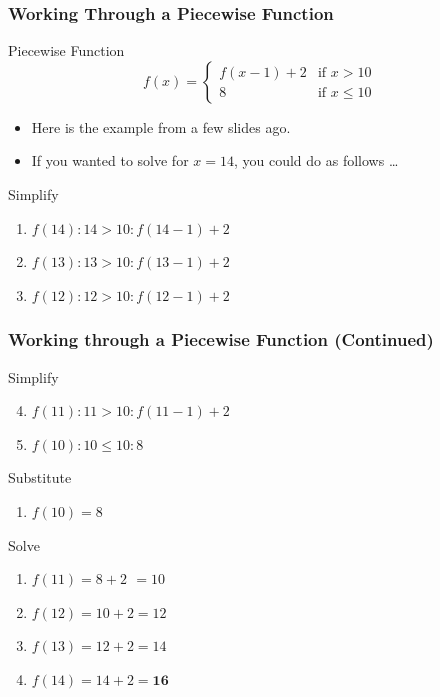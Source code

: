 \message{ !name(recursion.tex)}\documentclass[fleqn, t]{beamer}
\begin{document}
\begin{frame}
  \frametitle{Working Through a Piecewise Function}
  \begin{block}{Piecewise Function}
    \begin{equation*}
      f(x)= 
      \begin{cases}
        f(x - 1) + 2 & \text{if } x > 10 \\
        8 & \text{if } x \leq 10
      \end{cases}
    \end{equation*}
  \end{block}
  \begin{itemize}[<+->]
  \item Here is the example from a few slides ago. 
  \item If you wanted to solve for $x = 14$, you could do as follows \dots
  \end{itemize}
  \begin{block}{Simplify}
    \begin{enumerate}[<+->]
    \item $f(14) : 14 > 10 : f(14 - 1) + 2$
    \item $f(13) : 13 > 10 : f(13 - 1) + 2$
    \item $f(12) : 12 > 10 : f(12 - 1) + 2$
    \end{enumerate}
  \end{block}
\end{frame}

\begin{frame}
  \frametitle{Working through a Piecewise Function (Continued)}
  \begin{block}{Simplify}
  \begin{enumerate}[<+->]
    \setcounter{enumi}{3}
  \item $f(11) : 11 > 10 : f(11 - 1) + 2$
  \item $f(10) : 10 \leq 10 : 8$
  \end{enumerate}
  \end{block}
  \begin{block}{Substitute}
    \begin{enumerate}[<+->]
    \item $f(10) = 8$
    \end{enumerate}
  \end{block}
  \begin{block}{Solve}
    \begin{enumerate}[<+->]
    \item $f(11) = 8 + 2\, \  = 10$
    \item $f(12) = 10 + 2 = 12$
    \item $f(13) = 12 + 2 = 14$
    \item $f(14) = 14 + 2 = \textbf{16}$
    \end{enumerate}
  \end{block}
\end{frame}
\end{document}
